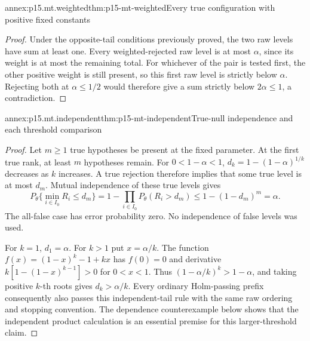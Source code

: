 \begin{annexitem}{annex:p15.mt.weighted}{thm:p15-mt-weighted}{Every true configuration with positive fixed constants}
\begin{proof}
Under the opposite-tail conditions previously proved, the two raw
levels have sum at least one. Every weighted-rejected raw level is
at most \(\alpha\), since its weight is at most the remaining total.
For whichever of the pair is tested first, the other positive weight
is still present, so this first raw level is strictly below \(\alpha\).
Rejecting both at \(\alpha\leq1/2\) would therefore give a sum strictly
below \(2\alpha\leq1\), a contradiction.
\end{proof}
\end{annexitem}

\begin{annexitem}{annex:p15.mt.independent}{thm:p15-mt-independent}{True-null independence and each threshold comparison}
\begin{proof}
Let \(m\geq1\) true hypotheses be present at the fixed parameter.
At the first true rank, at least \(m\) hypotheses remain. For
\(0<1-\alpha<1\), \(d_k=1-(1-\alpha)^{1/k}\) decreases as \(k\)
increases. A true rejection therefore implies that some true level
is at most \(d_m\). Mutual independence of these true levels gives
\[
 P_\theta\{\min_{i\in I_0}R_i\leq d_m\}
 =1-\prod_{i\in I_0}P_\theta(R_i>d_m)
 \leq1-(1-d_m)^m=\alpha.
\]
The all-false case has error probability zero. No independence of
false levels was used.

For \(k=1\), \(d_1=\alpha\). For \(k>1\) put \(x=\alpha/k\).
The function \(f(x)=(1-x)^k-1+kx\) has \(f(0)=0\) and
derivative \(k[1-(1-x)^{k-1}]>0\) for \(0<x<1\).
Thus \((1-\alpha/k)^k>1-\alpha\), and taking positive \(k\)-th
roots gives \(d_k>\alpha/k\).
Every ordinary Holm-passing prefix consequently also passes this
independent-tail rule with the same raw ordering and stopping convention.
The dependence counterexample below shows that the independent product
calculation is an essential premise for this larger-threshold claim.
\end{proof}
\end{annexitem}


